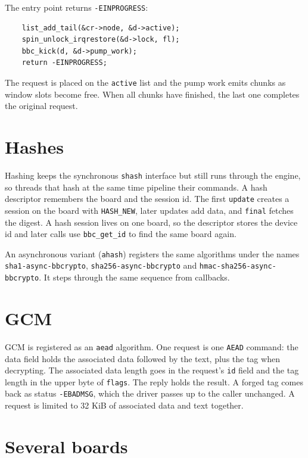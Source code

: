\documentclass[11pt,a4paper,oneside]{report}
\newcommand{\code}[1]{\texttt{\small #1}}
\begin{document}
The entry point returns \code{-EINPROGRESS}:

\begin{lstlisting}
	list_add_tail(&cr->node, &d->active);
	spin_unlock_irqrestore(&d->lock, fl);
	bbc_kick(d, &d->pump_work);
	return -EINPROGRESS;
\end{lstlisting}

The request is placed on the \code{active} list and the pump work emits chunks as window slots become free. When all chunks have finished, the last one completes the original request.

\section{Hashes}

Hashing keeps the synchronous \code{shash} interface but still runs through the engine, so threads that hash at the same time pipeline their commands. A hash descriptor remembers the board and the session id. The first \code{update} creates a session on the board with \code{HASH\_NEW}, later updates add data, and \code{final} fetches the digest. A hash session lives on one board, so the descriptor stores the device id and later calls use \code{bbc\_get\_id} to find the same board again.

An asynchronous variant (\code{ahash}) registers the same algorithms under the names \code{sha1-async-bbcrypto}, \code{sha256-async-bbcrypto} and \code{hmac-sha256-async-bbcrypto}. It steps through the same sequence from callbacks.

\section{GCM}

GCM is registered as an \code{aead} algorithm. One request is one \code{AEAD} command: the data field holds the associated data followed by the text, plus the tag when decrypting. The associated data length goes in the request's \code{id} field and the tag length in the upper byte of \code{flags}. The reply holds the result. A forged tag comes back as status \code{-EBADMSG}, which the driver passes up to the caller unchanged. A request is limited to 32 KiB of associated data and text together.

\section{Several boards}
\end{document}
